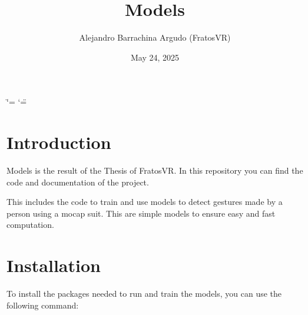 \documentclass[letterpaper,10pt,english]{sphinxmanual}
\title{Models}
\date{May 24, 2025}
\author{Alejandro Barrachina Argudo (FratosVR)}
\begin{document}
\ifdefined\shorthandoff
  \ifnum\catcode`\=\string=\active\shorthandoff{=}\fi
  \ifnum\catcode`\"=\active{}\fi
\fi

\pagestyle{empty}
\sphinxmaketitle
\pagestyle{plain}
\sphinxtableofcontents
\pagestyle{normal}
\label{\detokenize{index::doc}}



\chapter{Introduction}
\label{\detokenize{index:introduction}}
\sphinxAtStartPar
Models is the result of the Thesis of FratosVR. In this repository you can find the code and documentation of the project.

\sphinxAtStartPar
This includes the code to train and use models to detect gestures made by a person using a mocap suit. This are simple models to ensure easy and fast computation.


\chapter{Installation}
\label{\detokenize{index:installation}}
\sphinxAtStartPar
To install the packages needed to run and train the models, you can use the following command:

\sphinxAtStartPar
{}
\end{document}

